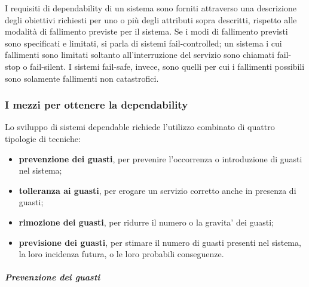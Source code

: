 \documentclass[14pt]{extarticle}
\begin{document}
I requisiti di dependability di un sistema sono forniti attraverso una descrizione degli obiettivi richiesti per uno o più degli attributi sopra descritti,
rispetto alle modalità di fallimento previste per il sistema. Se i modi di fallimento previsti sono specificati e limitati, si parla di sistemi fail-controlled; un
sistema i cui fallimenti sono limitati soltanto all’interruzione del servizio sono
chiamati fail-stop o fail-silent. I sistemi fail-safe, invece, sono quelli per cui i
fallimenti possibili sono solamente fallimenti non catastrofici.

\subsubsection{I mezzi per ottenere la dependability}
Lo sviluppo di sistemi dependable richiede l’utilizzo combinato di quattro
tipologie di tecniche:
\begin{itemize}

\item \textbf{prevenzione dei guasti}, per prevenire l’occorrenza o introduzione di
guasti nel sistema;
\item \textbf{tolleranza ai guasti}, per erogare un servizio corretto anche in presenza
di guasti;
\item \textbf{rimozione dei guasti}, per ridurre il numero o la gravita’ dei guasti;
\item \textbf{previsione dei guasti}, per stimare il numero di guasti presenti nel
sistema, la loro incidenza futura, o le loro probabili conseguenze.

\end{itemize}
\subparagraph{Prevenzione dei guasti}
\end{document}
